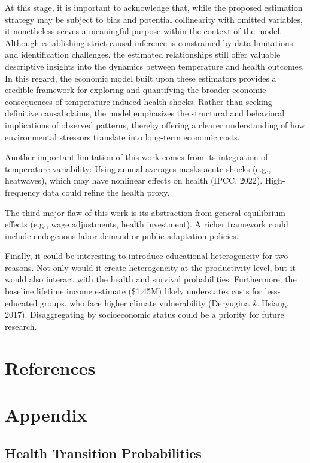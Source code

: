 \documentclass{article}
\begin{document}
At this stage, it is important to acknowledge that, while the proposed estimation strategy may be subject to bias and potential collinearity with omitted variables, it nonetheless serves a meaningful purpose within the context of the model. Although establishing strict causal inference is constrained by data limitations and identification challenges, the estimated relationships still offer valuable descriptive insights into the dynamics between temperature and health outcomes. In this regard, the economic model built upon these estimators provides a credible framework for exploring and quantifying the broader economic consequences of temperature-induced health shocks. Rather than seeking definitive causal claims, the model emphasizes the structural and behavioral implications of observed patterns, thereby offering a clearer understanding of how environmental stressors translate into long-term economic costs.

Another important limitation of this work comes from its integration of temperature variability:
Using annual averages masks acute shocks (e.g., heatwaves), which may have nonlinear effects on health (IPCC, 2022).
High-frequency data could refine the health proxy.

The third major flaw of this work is its abstraction from general equilibrium effects (e.g., wage adjustments, health investment).
A richer framework could include endogenous labor demand or public adaptation policies.

Finally, it could be interesting to introduce educational heterogeneity for two reasons. 
Not only would it create heterogeneity at the productivity level, but it would also interact with 
the health and survival probabilities.
Furthermore, the baseline lifetime income estimate (\$1.45M) likely understates costs for less-educated groups, who face higher climate vulnerability (Deryugina \& Hsiang, 2017).
Disaggregating by socioeconomic status could be a priority for future research.

\section{References}

\printbibliography[heading=none]

\newpage
\section{Appendix}

\subsection{Health Transition Probabilities}
\end{document}
